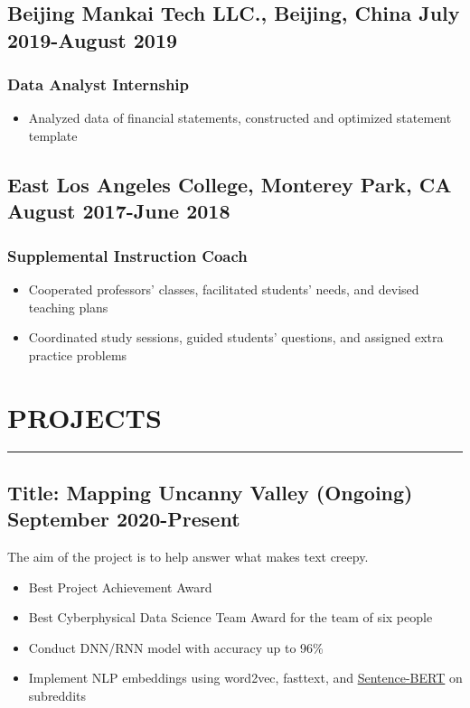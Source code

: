 \documentclass{article}
\newcommand{\divider}{\vskip2pt\hrule\vskip2pt}
\begin{document}
		
		\subsection*{Beijing Mankai Tech LLC.{\normalfont, Beijing, China \hfill July 2019-August 2019}}
		\subsubsection*{Data Analyst Internship}
		\begin{itemize}
			\item Analyzed data of financial statements, constructed and optimized statement template
		\end{itemize}
	
		\subsection*{East Los Angeles College{\normalfont, Monterey Park, CA \hfill August 2017-June 2018}}
		\subsubsection*{Supplemental Instruction Coach}
		\begin{itemize}
			\setlength\itemsep{-1pt}
			\item Cooperated professors' classes, facilitated students' needs, and devised teaching plans
			\item Coordinated study sessions, guided students' questions, and assigned extra practice problems
		\end{itemize}
	
	\section*{PROJECTS}
	\divider
	
		\subsection*{Title: Mapping Uncanny Valley (Ongoing) \hfill {\normalfont September 2020-Present}}
		\noindent
		\href{https://github.com/Anthonyive/Research-Mapping-Uncanny-Valley.git}{} The aim of the project is to help answer what makes text creepy.
		\begin{itemize}
			\setlength\itemsep{-1pt}
			\item Best Project Achievement Award
			\item Best Cyberphysical Data Science Team Award for the team of six people
			\item Conduct DNN/RNN model with accuracy up to 96\% 
			\item Implement NLP embeddings using word2vec, fasttext, and \href{https://arxiv.org/abs/1908.10084}{Sentence-BERT} on subreddits
		\end{itemize}
	
\end{document}
